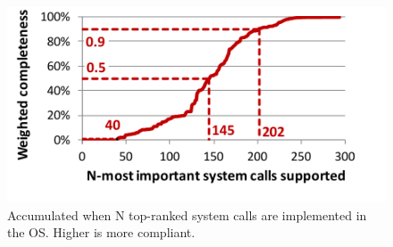 \begin{figure}[t]
\centering
\includegraphics[width=4.5in]{syspop/figures/syscall-compatibility.pdf}
\caption[Accumulated compatibility of system prototype prioritzed by importance]
{Accumulated \compatmetric{} when N top-ranked system calls are implemented in the OS. Higher is more compliant.}
\label{fig:syscall-compatibility}
\end{figure}

\begin{table}[t]
\footnotesize
\caption[Proposed steps of Linux system call implemetation prioritzed by importance]
{Five stages of implementing system calls based on the \usagemetric{} ranking. For each stage, a set of system calls is listed, with the work needed to accomplish (\# of system calls) and the \compatmetric{} that can be reached.}
\label{table:syscall-stage}
\end{table}

